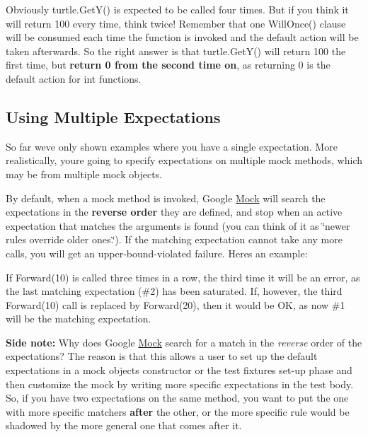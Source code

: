 Obviously {\ttfamily turtle.\+Get\+Y()} is expected to be called four times. But if you think it will return 100 every time, think twice! Remember that one {\ttfamily Will\+Once()} clause will be consumed each time the function is invoked and the default action will be taken afterwards. So the right answer is that {\ttfamily turtle.\+Get\+Y()} will return 100 the first time, but {\bfseries{return 0 from the second time on}}, as returning 0 is the default action for {\ttfamily int} functions.

\subsection*{Using Multiple Expectations}

So far we\textquotesingle{}ve only shown examples where you have a single expectation. More realistically, you\textquotesingle{}re going to specify expectations on multiple mock methods, which may be from multiple mock objects.

By default, when a mock method is invoked, Google \mbox{\hyperlink{class_mock}{Mock}} will search the expectations in the {\bfseries{reverse order}} they are defined, and stop when an active expectation that matches the arguments is found (you can think of it as \char`\"{}newer rules override older ones.\char`\"{}). If the matching expectation cannot take any more calls, you will get an upper-\/bound-\/violated failure. Here\textquotesingle{}s an example\+:


\begin{DoxyCode}{0}
\end{DoxyCode}


If {\ttfamily Forward(10)} is called three times in a row, the third time it will be an error, as the last matching expectation (\#2) has been saturated. If, however, the third {\ttfamily Forward(10)} call is replaced by {\ttfamily Forward(20)}, then it would be OK, as now \#1 will be the matching expectation.

{\bfseries{Side note\+:}} Why does Google \mbox{\hyperlink{class_mock}{Mock}} search for a match in the {\itshape reverse} order of the expectations? The reason is that this allows a user to set up the default expectations in a mock object\textquotesingle{}s constructor or the test fixture\textquotesingle{}s set-\/up phase and then customize the mock by writing more specific expectations in the test body. So, if you have two expectations on the same method, you want to put the one with more specific matchers {\bfseries{after}} the other, or the more specific rule would be shadowed by the more general one that comes after it.

